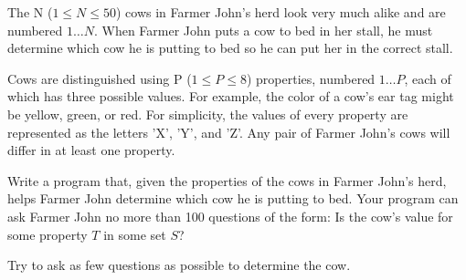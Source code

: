 The N ($1 \le N \le 50$) cows in Farmer John's herd look very much alike and are numbered $1 \ldots N$. When Farmer John puts a cow to bed in her stall, he must determine which cow he is putting to bed so he can put her in the correct stall. 

Cows are distinguished using P ($1 \le P \le 8$) properties, numbered $1 \ldots P$, each of which has three possible values. For example, the color of a cow's ear tag might be yellow, green, or red. For simplicity, the values of every property are represented as the letters 'X', 'Y', and 'Z'. Any pair of Farmer John's cows will differ in at least one property. 

Write a program that, given the properties of the cows in Farmer John's herd, helps Farmer John determine which cow he is putting to bed. Your program can ask Farmer John no more than 100 questions of the form: Is the cow's value for some property $T$ in some set $S$? 

Try to ask as few questions as possible to determine the cow.